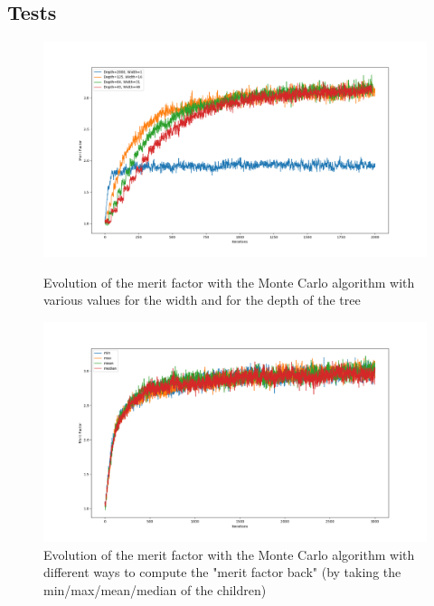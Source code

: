 \documentclass[a4paper,11pt,openany]{article}
\begin{document}
\subsection{Tests}
\begin{figure}[H]
\centering
\begin{minipage}{.45\textwidth}
  \begin{center}
  \includegraphics[scale=0.21]{Images/mc_width_depth}
  \caption{Evolution of the merit factor with the Monte Carlo algorithm with various values for the width and for the depth of the tree}
  \label{fig:mc_width_depth}
  \end{center}
\end{minipage}%
\hfill
\begin{minipage}{.45\textwidth}
  \begin{center}
  \includegraphics[scale=0.21]{Images/mc_merit_factor_back}
  \caption{Evolution of the merit factor with the Monte Carlo algorithm with different ways to compute the "merit factor back" (by taking the min/max/mean/median of the children)}
  \label{fig:mc_merit_factor_back}
  \end{center}
\end{minipage}
\end{figure}
\end{document}
